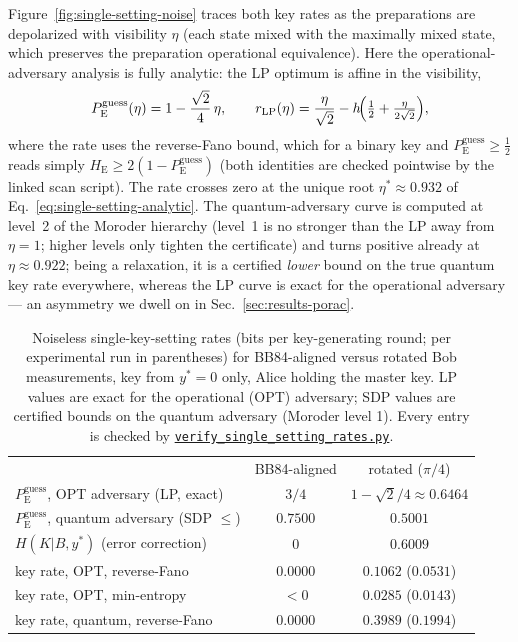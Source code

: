 \documentclass[aps,pra,twocolumn,superscriptaddress,longbibliography,nofootinbib]{revtex4-2}
\newcommand{\Eve}{\mathrm{E}}
\newcommand{\pguess}{P_{\Eve}^{\mathrm{guess}}}
\newcommand{\repoBase}{https://github.com/eliewolfe/RandomnessWinterSchool2026/blob/main/paper/scripts}
\newcommand{\repoScript}[1]{\href{\repoBase/#1}{\texttt{#1}}}
\begin{document}
Figure~\ref{fig:single-setting-noise} traces both key rates as the
preparations are depolarized with visibility $\eta$ (each state mixed
with the maximally mixed state, which preserves the preparation
operational equivalence). Here the operational-adversary analysis is
fully analytic: the LP optimum is affine in the visibility,
\begin{equation}
\label{eq:single-setting-analytic}
  \pguess(\eta) = 1-\frac{\sqrt2}{4}\,\eta ,
  \qquad
  r_{\mathrm{LP}}(\eta)
  = \frac{\eta}{\sqrt2}
  - h\!\Bigl(\tfrac12+\tfrac{\eta}{2\sqrt2}\Bigr),
\end{equation}
where the rate uses the reverse-Fano bound, which for a binary key and
$\pguess\ge\tfrac12$ reads simply $H_{\Eve}\ge 2(1-\pguess)$ (both
identities are checked pointwise by the linked scan script). The rate
crosses zero at the unique root $\eta^{\ast}\approx 0.932$ of
Eq.~\eqref{eq:single-setting-analytic}. The quantum-adversary curve is
computed at level~2 of the Moroder hierarchy (level~1 is no stronger
than the LP away from $\eta=1$; higher levels only tighten the
certificate) and turns positive already at $\eta\approx0.922$; being a
relaxation, it is a certified \emph{lower} bound on the true quantum key
rate everywhere, whereas the LP curve is exact for the operational
adversary --- an asymmetry we dwell on in
Sec.~\ref{sec:results-porac}.

\begin{table}
\caption{\label{tab:single-setting}Noiseless single-key-setting rates
(bits per key-generating round; per experimental run in parentheses)
for BB84-aligned versus rotated Bob measurements, key from $y^{\ast}=0$
only, Alice holding the master key. LP values are exact for the
operational (OPT) adversary; SDP values are certified bounds on the
quantum adversary (Moroder level 1). Every entry is checked by
\repoScript{verify\_single\_setting\_rates.py}.}
\begin{ruledtabular}
\begin{tabular}{lcc}
 & BB84-aligned & rotated ($\pi/4$) \\
\colrule
$\pguess$, OPT adversary (LP, exact) & $3/4$ & $1-\sqrt{2}/4\approx0.6464$ \\
$\pguess$, quantum adversary (SDP $\le$) & $0.7500$ & $0.5001$ \\
$H(K|B,y^{\ast})$ (error correction) & $0$ & $0.6009$ \\
key rate, OPT, reverse-Fano & $0.0000$ & $0.1062$ ($0.0531$) \\
key rate, OPT, min-entropy & $<0$ & $0.0285$ ($0.0143$) \\
key rate, quantum, reverse-Fano & $0.0000$ & $0.3989$ ($0.1994$) \\
\end{tabular}
\end{ruledtabular}
\end{table}
\end{document}
